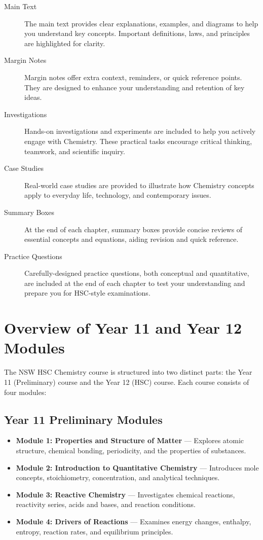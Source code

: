 \begin{description}
\item[Main Text] The main text provides clear explanations, examples, and diagrams to help you understand key concepts. Important definitions, laws, and principles are highlighted for clarity.
\item[Margin Notes] Margin notes offer extra context, reminders, or quick reference points. They are designed to enhance your understanding and retention of key ideas.
\item[Investigations] Hands-on investigations and experiments are included to help you actively engage with Chemistry. These practical tasks encourage critical thinking, teamwork, and scientific inquiry.
\item[Case Studies] Real-world case studies are provided to illustrate how Chemistry concepts apply to everyday life, technology, and contemporary issues.
\item[Summary Boxes] At the end of each chapter, summary boxes provide concise reviews of essential concepts and equations, aiding revision and quick reference.
\item[Practice Questions] Carefully-designed practice questions, both conceptual and quantitative, are included at the end of each chapter to test your understanding and prepare you for HSC-style examinations.
\end{description}

\section{Overview of Year 11 and Year 12 Modules}
\FloatBarrier
\FloatBarrier
\FloatBarrier

The NSW HSC Chemistry course is structured into two distinct parts: the Year 11 (Preliminary) course and the Year 12 (HSC) course. Each course consists of four modules:

\subsection{Year 11 Preliminary Modules}
\FloatBarrier
\FloatBarrier
\FloatBarrier

\begin{itemize}
\item \textbf{Module 1: Properties and Structure of Matter} — Explores atomic structure, chemical bonding, periodicity, and the properties of substances.
\item \textbf{Module 2: Introduction to Quantitative Chemistry} — Introduces mole concepts, stoichiometry, concentration, and analytical techniques.
\item \textbf{Module 3: Reactive Chemistry} — Investigates chemical reactions, reactivity series, acids and bases, and reaction conditions.
\item \textbf{Module 4: Drivers of Reactions} — Examines energy changes, enthalpy, entropy, reaction rates, and equilibrium principles.
\end{itemize}

